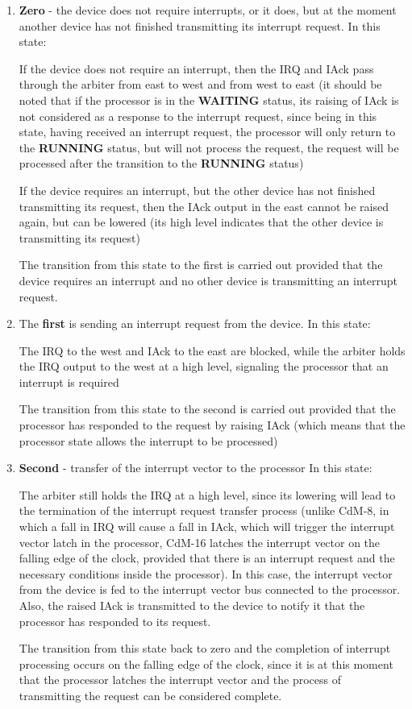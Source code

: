 \begin{enumerate}
	\item \textbf{Zero} - the device does not require interrupts, or it does, but at the moment another device has not finished transmitting its interrupt request. In this state:

		If the device does not require an interrupt, then the IRQ and IAck pass through the arbiter from east to west and from west to east (it should be noted that if the processor is in the \textbf{WAITING} status, its raising of IAck is not considered as a response to the interrupt request, since being in this state, having received an interrupt request, the processor will only return to the \textbf{RUNNING} status, but will not process the request, the request will be processed after the transition to the \textbf{RUNNING} status)

		If the device requires an interrupt, but the other device has not finished transmitting its request, then the IAck output in the east cannot be raised again, but can be lowered (its high level indicates that the other device is transmitting its request)

		The transition from this state to the first is carried out provided that the device requires an interrupt and no other device is transmitting an interrupt request.
	\item The \textbf{first} is sending an interrupt request from the device.
		In this state:

		The IRQ to the west and IAck to the east are blocked, while the arbiter holds the IRQ output to the west at a high level, signaling the processor that an interrupt is required

		The transition from this state to the second is carried out provided that the processor has responded to the request by raising IAck (which means that the processor state allows the interrupt to be processed)
	\item \textbf{Second} - transfer of the interrupt vector to the processor
		In this state:

		The arbiter still holds the IRQ at a high level, since its lowering will lead to the termination of the interrupt request transfer process (unlike CdM-8, in which a fall in IRQ will cause a fall in IAck, which will trigger the interrupt vector latch in the processor, CdM-16 latches the interrupt vector on the falling edge of the clock, provided that there is an interrupt request and the necessary conditions inside the processor). In this case, the interrupt vector from the device is fed to the interrupt vector bus connected to the processor. Also, the raised IAck is transmitted to the device to notify it that the processor has responded to its request.

		The transition from this state back to zero and the completion of interrupt processing occurs on the falling edge of the clock, since it is at this moment that the processor latches the interrupt vector and the process of transmitting the request can be considered complete.
\end{enumerate}

